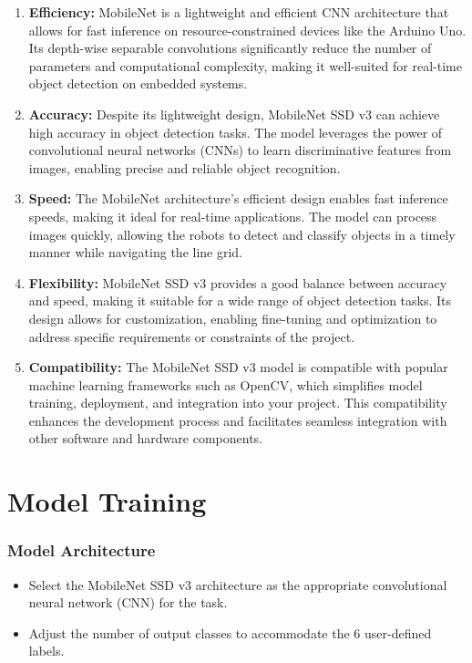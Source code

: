 \documentclass[a4paper,12pt,oneside]{book}
\begin{document}
\begin{enumerate}
  \item \textbf{Efficiency:} MobileNet is a lightweight and efficient CNN architecture that allows for fast inference on resource-constrained devices like the Arduino Uno. Its depth-wise separable convolutions significantly reduce the number of parameters and computational complexity, making it well-suited for real-time object detection on embedded systems.
  \item \textbf{Accuracy:} Despite its lightweight design, MobileNet SSD v3 can achieve high accuracy in object detection tasks. The model leverages the power of convolutional neural networks (CNNs) to learn discriminative features from images, enabling precise and reliable object recognition.
  \item \textbf{Speed:} The MobileNet architecture's efficient design enables fast inference speeds, making it ideal for real-time applications. The model can process images quickly, allowing the robots to detect and classify objects in a timely manner while navigating the line grid.
  \item \textbf{Flexibility:} MobileNet SSD v3 provides a good balance between accuracy and speed, making it suitable for a wide range of object detection tasks. Its design allows for customization, enabling fine-tuning and optimization to address specific requirements or constraints of the project.
  \item \textbf{Compatibility:} The MobileNet SSD v3 model is compatible with popular machine learning frameworks such as OpenCV, which simplifies model training, deployment, and integration into your project. This compatibility enhances the development process and facilitates seamless integration with other software and hardware components.
\end{enumerate}

\newpage

\section{Model Training}
\subsubsection{Model Architecture}
\begin{itemize}
    \item Select the MobileNet SSD v3 architecture as the appropriate convolutional neural network (CNN) for the task.
    \item Adjust the number of output classes to accommodate the 6 user-defined labels.
\end{itemize}
\end{document}
